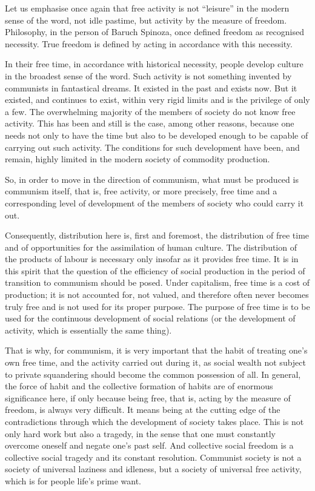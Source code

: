 \documentclass[../main]{subfiles}
\begin{document}
Let us emphasise once again that free activity is not “leisure” in the modern sense of the word, not idle pastime, but activity by the measure of freedom. Philosophy, in the person of Baruch Spinoza, once defined freedom as recognised necessity. True freedom is defined by acting in accordance with this necessity.

In their free time, in accordance with historical necessity, people develop culture in the broadest sense of the word. Such activity is not something invented by communists in fantastical dreams. It existed in the past and exists now. But it existed, and continues to exist, within very rigid limits and is the privilege of only a few. The overwhelming majority of the members of society do not know free activity. This has been and still is the case, among other reasons, because one needs not only to have the time but also to be developed enough to be capable of carrying out such activity. The conditions for such development have been, and remain, highly limited in the modern society of commodity production.

So, in order to move in the direction of communism, what must be produced is communism itself, that is, free activity, or more precisely, free time and a corresponding level of development of the members of society who could carry it out.

Consequently, distribution here is, first and foremost, the distribution of free time and of opportunities for the assimilation of human culture. The distribution of the products of labour is necessary only insofar as it provides free time. It is in this spirit that the question of the efficiency of social production in the period of transition to communism should be posed. Under capitalism, free time is a cost of production; it is not accounted for, not valued, and therefore often never becomes truly free and is not used for its proper purpose. The purpose of free time is to be used for the continuous development of social relations (or the development of activity, which is essentially the same thing).

That is why, for communism, it is very important that the habit of treating one's own free time, and the activity carried out during it, as social wealth not subject to private squandering should become the common possession of all. In general, the force of habit and the collective formation of habits are of enormous significance here, if only because being free, that is, acting by the measure of freedom, is always very difficult. It means being at the cutting edge of the contradictions through which the development of society takes place. This is not only hard work but also a tragedy, in the sense that one must constantly overcome oneself and negate one's past self. And collective social freedom is a collective social tragedy and its constant resolution. Communist society is not a society of universal laziness and idleness, but a society of universal free activity, which is for people life’s prime want.
\end{document}

